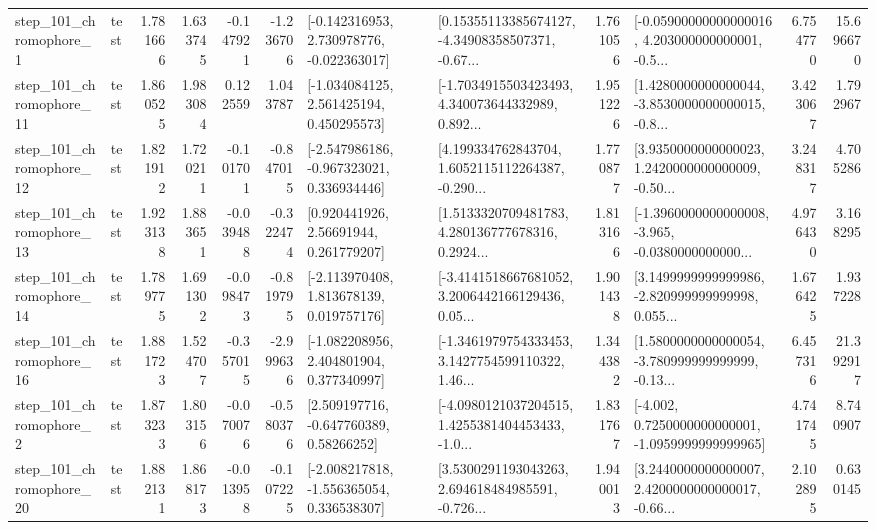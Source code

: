 \begin{tabular}{llrrrrllrlrr}
   step\_101\_chromophore\_1 &      test &      1.781666 &    1.633745 &     -0.147921 & -1.236706 &   [-0.142316953, 2.730978776, -0.022363017] &  [0.15355113385674127, -4.34908358507371, -0.67... &       1.761056 &  [-0.05900000000000016, 4.203000000000001, -0.5... &            6.754770 &         15.696670 \\
  step\_101\_chromophore\_11 &      test &      1.860525 &    1.983084 &      0.122559 &  1.043787 &    [-1.034084125, 2.561425194, 0.450295573] &  [-1.7034915503423493, 4.340073644332989, 0.892... &       1.951226 &  [1.4280000000000044, -3.8530000000000015, -0.8... &            3.423067 &          1.792967 \\
  step\_101\_chromophore\_12 &      test &      1.821912 &    1.720211 &     -0.101701 & -0.847015 &   [-2.547986186, -0.967323021, 0.336934446] &  [4.199334762843704, 1.6052115112264387, -0.290... &       1.770877 &  [3.9350000000000023, 1.2420000000000009, -0.50... &            3.248317 &          4.705286 \\
  step\_101\_chromophore\_13 &      test &      1.923138 &    1.883651 &     -0.039488 & -0.322474 &      [0.920441926, 2.56691944, 0.261779207] &  [1.5133320709481783, 4.280136777678316, 0.2924... &       1.813166 &  [-1.3960000000000008, -3.965, -0.0380000000000... &            4.976430 &          3.168295 \\
  step\_101\_chromophore\_14 &      test &      1.789775 &    1.691302 &     -0.098473 & -0.819795 &    [-2.113970408, 1.813678139, 0.019757176] &  [-3.4141518667681052, 3.2006442166129436, 0.05... &       1.901438 &  [3.1499999999999986, -2.820999999999998, 0.055... &            1.676425 &          1.937228 \\
  step\_101\_chromophore\_16 &      test &      1.881723 &    1.524707 &     -0.357015 & -2.999636 &    [-1.082208956, 2.404801904, 0.377340997] &  [-1.3461979754333453, 3.1427754599110322, 1.46... &       1.344382 &  [1.5800000000000054, -3.780999999999999, -0.13... &            6.457316 &         21.392917 \\
   step\_101\_chromophore\_2 &      test &      1.873233 &    1.803156 &     -0.070076 & -0.580376 &     [2.509197716, -0.647760389, 0.58266252] &  [-4.0980121037204515, 1.4255381404453433, -1.0... &       1.831767 &  [-4.002, 0.7250000000000001, -1.0959999999999965] &            4.741745 &          8.740907 \\
  step\_101\_chromophore\_20 &      test &      1.882131 &    1.868173 &     -0.013958 & -0.107225 &   [-2.008217818, -1.556365054, 0.336538307] &  [3.5300291193043263, 2.694618484985591, -0.726... &       1.940013 &  [3.2440000000000007, 2.4200000000000017, -0.66... &            2.102895 &          0.630145 \\

\end{tabular}
